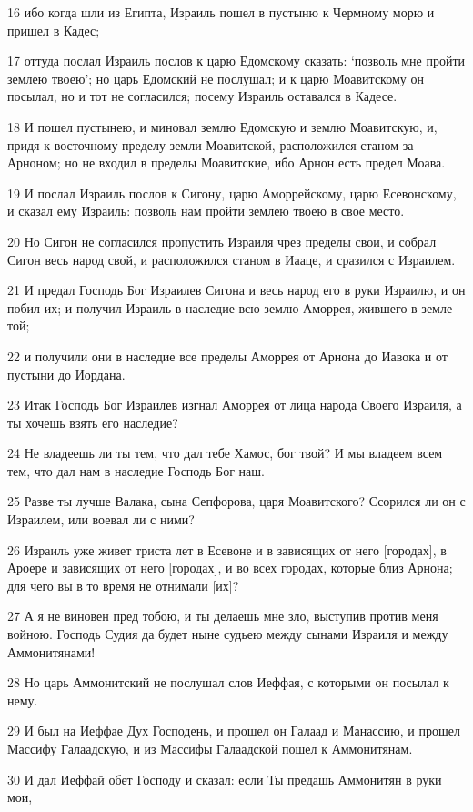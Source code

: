 \par 16 ибо когда шли из Египта, Израиль пошел в пустыню к Чермному морю и пришел в Кадес;
\par 17 оттуда послал Израиль послов к царю Едомскому сказать: `позволь мне пройти землею твоею'; но царь Едомский не послушал; и к царю Моавитскому он посылал, но и тот не согласился; посему Израиль оставался в Кадесе.
\par 18 И пошел пустынею, и миновал землю Едомскую и землю Моавитскую, и, придя к восточному пределу земли Моавитской, расположился станом за Арноном; но не входил в пределы Моавитские, ибо Арнон есть предел Моава.
\par 19 И послал Израиль послов к Сигону, царю Аморрейскому, царю Есевонскому, и сказал ему Израиль: позволь нам пройти землею твоею в свое место.
\par 20 Но Сигон не согласился пропустить Израиля чрез пределы свои, и собрал Сигон весь народ свой, и расположился станом в Иааце, и сразился с Израилем.
\par 21 И предал Господь Бог Израилев Сигона и весь народ его в руки Израилю, и он побил их; и получил Израиль в наследие всю землю Аморрея, жившего в земле той;
\par 22 и получили они в наследие все пределы Аморрея от Арнона до Иавока и от пустыни до Иордана.
\par 23 Итак Господь Бог Израилев изгнал Аморрея от лица народа Своего Израиля, а ты хочешь взять его наследие?
\par 24 Не владеешь ли ты тем, что дал тебе Хамос, бог твой? И мы владеем всем тем, что дал нам в наследие Господь Бог наш.
\par 25 Разве ты лучше Валака, сына Сепфорова, царя Моавитского? Ссорился ли он с Израилем, или воевал ли с ними?
\par 26 Израиль уже живет триста лет в Есевоне и в зависящих от него [городах], в Ароере и зависящих от него [городах], и во всех городах, которые близ Арнона; для чего вы в то время не отнимали [их]?
\par 27 А я не виновен пред тобою, и ты делаешь мне зло, выступив против меня войною. Господь Судия да будет ныне судьею между сынами Израиля и между Аммонитянами!
\par 28 Но царь Аммонитский не послушал слов Иеффая, с которыми он посылал к нему.
\par 29 И был на Иеффае Дух Господень, и прошел он Галаад и Манассию, и прошел Массифу Галаадскую, и из Массифы Галаадской пошел к Аммонитянам.
\par 30 И дал Иеффай обет Господу и сказал: если Ты предашь Аммонитян в руки мои,
